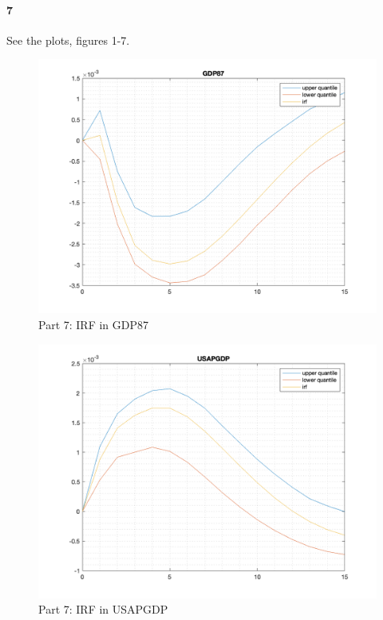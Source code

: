 \documentclass[10pt,letter]{article}
\newcommand{\problempart}[1]{\paragraph{#1}}
\begin{document}
\problempart{7} See the plots, figures 1-7.
\begin{figure}
\begin{center}
\includegraphics[width=15cm]{ps9fig1}
\caption{Part 7: IRF in GDP87}
\end{center}
\end{figure}
\begin{figure}
\begin{center}
\includegraphics[width=15cm]{ps9fig2}
\caption{Part 7: IRF in USAPGDP}
\end{center}
\end{figure}
\end{document}
